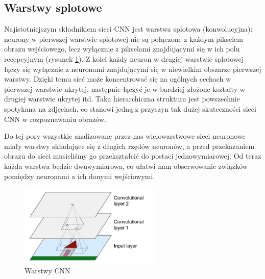 \documentclass{article}
\begin{document}
\subsection{Warstwy splotowe}
Najistotniejszym składnikiem sieci CNN jest warstwa splotowa (konwolucyjna): neurony w pierwszej warstwie splotowej nie są połączone z każdym pikselem obrazu wejściowego, lecz wyłącznie z pikselami znajdującymi się w ich polu recepcyjnym (rysunek \ref{warstwa_splotowa}). Z kolei każdy neuron w drugiej warstwie splotowej łączy się wyłącznie z neuronami znajdującymi się w niewielkim obszarze pierwszej warstwy. Dzięki temu sieć może koncentrować się na ogólnych cechach w pierwszej warstwie ukrytej, następnie łączyć je w bardziej złożone kształty w drugiej warstwie ukrytej itd. Taka hierarchiczna struktura jest powszechnie spotykana na zdjęciach, co stanowi jedną z przyczyn tak dużej skuteczności sieci CNN w rozpoznawaniu obrazów. \cite{geron}

Do tej pory wszystkie analizowane przez nas wielowarstwowe sieci neuronowe miały warstwy składające się z długich rzędów neuronów, a przed przekazaniem obrazu do sieci musieliśmy go przekształcić do postaci jednowymiarowej. Od teraz każda warstwa będzie dwuwymiarowa, co ułatwi nam obserwowanie związków pomiędzy neuronami a ich danymi wejściowymi. \cite{geron}
\begin{figure}[H]
	\centering
	\includegraphics[width=0.6\textwidth,keepaspectratio=true]{warstwa_splotowa}
	\caption{Warstwy CNN \cite{geron}}
	\label{warstwa_splotowa}
\end{figure}
\end{document}
